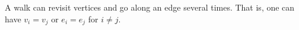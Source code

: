

\setcounter{section}{1}
\setcounter{subsection}{5}
\setcounter{dfn}{15}

\begin{rem}
A walk can revisit vertices and go along an edge several times.
That is, one can have $v_i = v_j$ or $e_i = e_j$ for $i \ne j$.
\end{rem}

